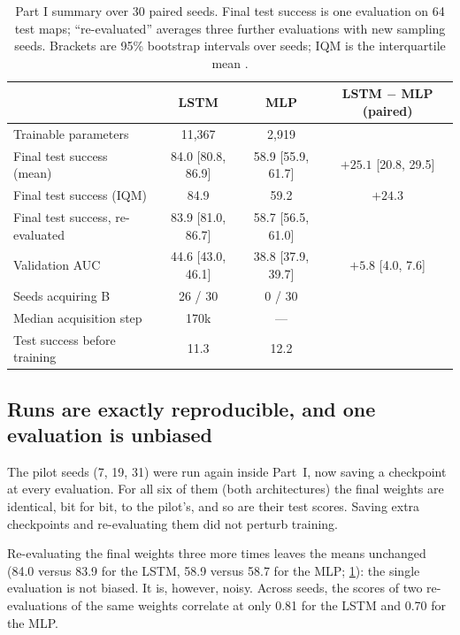 \begin{table}[t]
  \centering
  \caption{Part I summary over 30 paired seeds. Final test success is one evaluation on 64 test
  maps; ``re-evaluated'' averages three further evaluations with new sampling seeds. Brackets
  are 95\% bootstrap intervals over seeds; IQM is the interquartile mean
  \citep{agarwal2021precipice}.}
  \label{tab:summary}
  \small
  \begin{tabular}{lccc}
    \toprule
    & LSTM & MLP & LSTM $-$ MLP (paired) \\
    \midrule
    Trainable parameters & 11,367 & 2,919 & \\
    Final test success (mean) & 84.0 [80.8, 86.9] & 58.9 [55.9, 61.7] & $+25.1$ [20.8, 29.5] \\
    Final test success (IQM) & 84.9 & 59.2 & $+24.3$ \\
    Final test success, re-evaluated & 83.9 [81.0, 86.7] & 58.7 [56.5, 61.0] & \\
    Validation AUC & 44.6 [43.0, 46.1] & 38.8 [37.9, 39.7] & $+5.8$ [4.0, 7.6] \\
    Seeds acquiring B & 26 / 30 & 0 / 30 & \\
    Median acquisition step & 170k & --- & \\
    Test success before training & 11.3 & 12.2 & \\
    \bottomrule
  \end{tabular}
\end{table}

\subsection{Runs are exactly reproducible, and one evaluation is unbiased}
\label{sec:results-repro}

The pilot seeds (7, 19, 31) were run again inside Part~I, now saving a checkpoint at every
evaluation. For all six of them (both architectures) the final weights are identical, bit for
bit, to the pilot's, and so are their test scores. Saving extra checkpoints and re-evaluating
them did not perturb training.

Re-evaluating the final weights three more times leaves the means unchanged (84.0 versus 83.9 for
the LSTM, 58.9 versus 58.7 for the MLP; \cref{tab:summary}): the single evaluation is not biased.
It is, however, noisy. Across seeds, the scores of two re-evaluations of the same weights
correlate at only 0.81 for the LSTM and 0.70 for the MLP.

